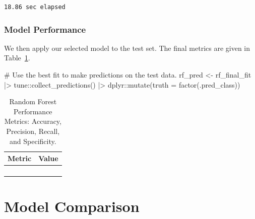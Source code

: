 \documentclass[
  letterpaper,
  DIV=11,
  numbers=noendperiod]{scrartcl}
\newenvironment{Shaded}{\begin{snugshade}}{\end{snugshade}}
\newcommand{\AttributeTok}[1]{\textcolor[rgb]{0.40,0.45,0.13}{#1}}
\newcommand{\CommentTok}[1]{\textcolor[rgb]{0.37,0.37,0.37}{#1}}
\newcommand{\FunctionTok}[1]{\textcolor[rgb]{0.28,0.35,0.67}{#1}}
\newcommand{\NormalTok}[1]{\textcolor[rgb]{0.00,0.23,0.31}{#1}}
\newcommand{\OtherTok}[1]{\textcolor[rgb]{0.00,0.23,0.31}{#1}}
\newcommand{\SpecialCharTok}[1]{\textcolor[rgb]{0.37,0.37,0.37}{#1}}
\begin{document}
\begin{verbatim}
18.86 sec elapsed
\end{verbatim}

\subsubsection{Model Performance}\label{model-performance-5}

We then apply our selected model to the test set. The final metrics are
given in Table~\ref{tbl-rf-performance-pdf}.

\begin{Shaded}
\begin{Highlighting}[]
\CommentTok{\# Use the best fit to make predictions on the test data.}
\NormalTok{rf\_pred }\OtherTok{\textless{}{-}} 
\NormalTok{  rf\_final\_fit }\SpecialCharTok{|\textgreater{}} 
\NormalTok{  tune}\SpecialCharTok{::}\FunctionTok{collect\_predictions}\NormalTok{() }\SpecialCharTok{|\textgreater{}}
\NormalTok{  dplyr}\SpecialCharTok{::}\FunctionTok{mutate}\NormalTok{(}\AttributeTok{truth =} \FunctionTok{factor}\NormalTok{(.pred\_class))}
\end{Highlighting}
\end{Shaded}

\begin{longtable}{>{\raggedright\arraybackslash}p{}>{\raggedleft\arraybackslash}p{}}

\caption{\label{tbl-rf-performance-pdf}Random Forest Performance
Metrics: Accuracy, Precision, Recall, and Specificity.}

\tabularnewline

\toprule
Metric & Value \\ 
\midrule\addlinespace[2.5pt]
\cellcolor[HTML]{FFFFFF}{Accuracy} & \cellcolor[HTML]{FFFFFF}{94.5} \\ 
\cellcolor[HTML]{FFFFFF}{Precision} & \cellcolor[HTML]{FFFFFF}{84.6} \\ 
\cellcolor[HTML]{FFFFFF}{Recall} & \cellcolor[HTML]{FFFFFF}{95.7} \\ 
\cellcolor[HTML]{FFFFFF}{Specificity} & \cellcolor[HTML]{FFFFFF}{94.1} \\ 
\bottomrule

\end{longtable}

\section{Model Comparison}\label{model-comparison}
\end{document}
